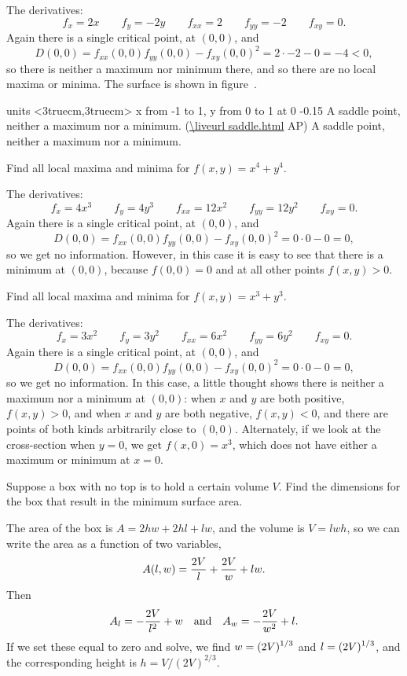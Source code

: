 The derivatives:
$$f_x=2x \qquad f_y=-2y \qquad f_{xx}=2 \qquad f_{yy}=-2 \qquad
f_{xy}=0.$$
Again there is a single critical point, at $(0,0)$, and
$$D(0,0)=f_{xx}(0,0)f_{yy}(0,0)-f_{xy}(0,0)^2=
2\cdot-2-0=-4<0,$$
so there is neither a maximum nor minimum there, and so there are no
local maxima or minima. The surface is shown in
figure~. 
\endexample

\figure
\texonly
\vbox{\beginpicture
\normalgraphs
\ninepoint
\setcoordinatesystem units <3truecm,3truecm>
\setplotarea x from -1 to 1, y from 0 to 1
 at 0 -0.15
\endpicture}
\begincaption
A saddle point, neither a maximum nor a minimum.
(\expandafter\url\expandafter{\liveurl saddle.html}%
AP\endurl)
\endcaption
\endtexonly
{}
\htmlonly
\begincaption
A saddle point, neither a maximum nor a minimum.
\endcaption
\endhtmlonly
\endfigure

\example Find all local maxima and minima for $f(x,y)=x^4+y^4$.

The derivatives:
$$f_x=4x^3 \qquad f_y=4y^3 \qquad f_{xx}=12x^2 \qquad f_{yy}=12y^2 \qquad
f_{xy}=0.$$
Again there is a single critical point, at $(0,0)$, and
$$D(0,0)=f_{xx}(0,0)f_{yy}(0,0)-f_{xy}(0,0)^2=
0\cdot0-0=0,$$
so we get no information. However, in this case it is easy to see that
there is a minimum at $(0,0)$, because $f(0,0)=0$ and
at all other points $f(x,y)>0$.
\endexample

\example Find all local maxima and minima for $f(x,y)=x^3+y^3$.

The derivatives:
$$f_x=3x^2 \qquad f_y=3y^2 \qquad f_{xx}=6x^2 \qquad f_{yy}=6y^2 \qquad
f_{xy}=0.$$
Again there is a single critical point, at $(0,0)$, and
$$D(0,0)=f_{xx}(0,0)f_{yy}(0,0)-f_{xy}(0,0)^2=
0\cdot0-0=0,$$
so we get no information. In this case, a little thought shows there
is neither a maximum nor a minimum at $(0,0)$: when $x$ and $y$ are
both positive, $f(x,y)>0$, and when $x$ and $y$ are
both negative, $f(x,y)<0$, and there are points of both kinds
arbitrarily close to $(0,0)$. Alternately, if we look at the
cross-section when $y=0$, we get $f(x,0)=x^3$, which does not have
either a maximum or minimum at $x=0$.
\endexample

\example Suppose a box with no top is to hold a certain volume $V$. Find
the dimensions for the box that result in the minimum surface area.

The area of the box is $A=2hw+2hl+lw$, and the volume is $V=lwh$, so
we can write the area as a function of two variables,
$$A(l,w)={2V\over l}+{2V\over w}+lw.$$
Then
$$A_l=-{2V\over l^2}+w \hbox{\quad and\quad} A_w=-{2V\over w^2}+l.$$
If we set these equal to zero and solve, we find
$\displaystyle w=(2V)^{1/3}$ and $\displaystyle l=(2V)^{1/3}$, and the corresponding
height is $h=V/(2V)^{2/3}$.


